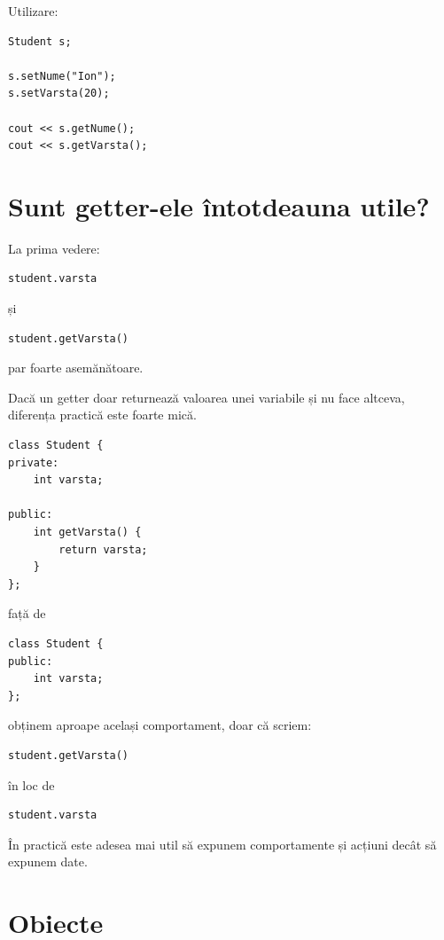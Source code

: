 \documentclass[12pt,a4paper]{article}
\begin{document}
Utilizare:

\begin{lstlisting}
Student s;

s.setNume("Ion");
s.setVarsta(20);

cout << s.getNume();
cout << s.getVarsta();
\end{lstlisting}

\section{Sunt getter-ele întotdeauna utile?}

La prima vedere:

\begin{lstlisting}
student.varsta
\end{lstlisting}

și

\begin{lstlisting}
student.getVarsta()
\end{lstlisting}

par foarte asemănătoare.

Dacă un getter doar returnează valoarea unei variabile și nu face altceva, diferența practică este foarte mică.

\begin{lstlisting}
class Student {
private:
    int varsta;

public:
    int getVarsta() {
        return varsta;
    }
};
\end{lstlisting}

față de

\begin{lstlisting}
class Student {
public:
    int varsta;
};
\end{lstlisting}

obținem aproape același comportament, doar că scriem:

\begin{lstlisting}
student.getVarsta()
\end{lstlisting}

în loc de

\begin{lstlisting}
student.varsta
\end{lstlisting}

În practică este adesea mai util să expunem comportamente și acțiuni decât să expunem date.

\section{Obiecte}
\end{document}
